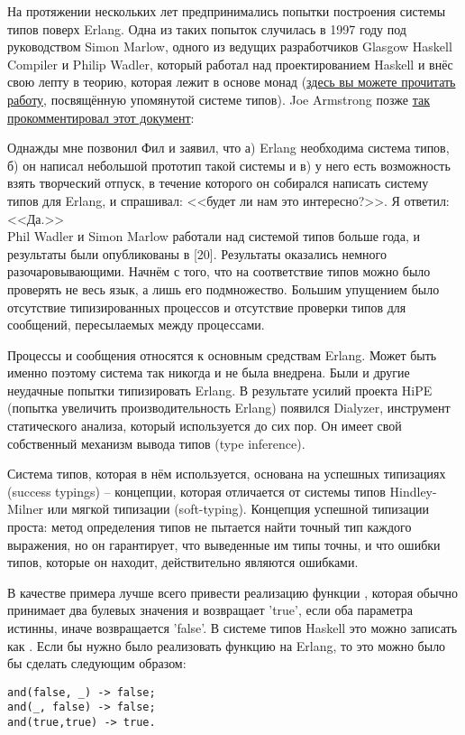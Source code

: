 На протяжении нескольких лет предпринимались попытки построения системы типов поверх Erlang.
Одна из таких попыток случилась в 1997 году под руководством Simon Marlow, одного из ведущих разработчиков Glasgow Haskell Compiler и Philip Wadler, который работал над проектированием Haskell и внёс свою лепту в теорию, которая лежит в основе монад (\href{http://www.haskell.org/~simonmar/papers/erltc.pdf}{здесь вы можете прочитать работу}, посвящённую упомянутой системе типов).
Joe Armstrong позже \href{http://www.cs.chalmers.se/Cs/Grundutb/Kurser/ppxt/HT2007/general/languages/armstrong-erlang\_history.pdf}{так прокомментировал этот документ}:\\
\colorbox{lgray}
{
    \begin{minipage}{\linewidth}
Однажды мне позвонил Фил и заявил, что а) Erlang необходима система типов, б) он написал небольшой прототип такой системы и в) у него есть возможность взять творческий отпуск, в течение которого он собирался написать систему типов для Erlang, и спрашивал: <<будет ли нам это интересно?>>.
Я ответил: <<Да.>>\\
Phil Wadler и Simon Marlow работали над системой типов больше года, и результаты были опубликованы в [20].
Результаты оказались немного разочаровывающими.
Начнём с того, что на соответствие типов можно было проверять не весь язык, а лишь его подмножество.
Большим упущением было отсутствие типизированных процессов и отсутствие проверки типов для сообщений, пересылаемых между процессами.
    \end{minipage}
}

Процессы и сообщения относятся к основным средствам Erlang.
Может быть именно поэтому система так никогда и не была внедрена.
Были и другие неудачные попытки типизировать Erlang.
В результате усилий проекта HiPE (попытка увеличить производительность Erlang) появился Dialyzer, инструмент статического анализа, который используется до сих пор.
Он имеет свой собственный механизм вывода типов (type inference).

Система типов, которая в нём используется, основана на успешных типизациях (success typings) \--- концепции, которая отличается от системы типов Hindley\--Milner или мягкой типизации (soft\--typing).
Концепция успешной типизации проста: метод определения типов не пытается найти точный тип каждого выражения, но он гарантирует, что выведенные им типы точны, и что ошибки типов, которые он находит, действительно являются ошибками.

В качестве примера лучше всего привести реализацию функции , которая обычно принимает два булевых значения и возвращает 'true', если оба параметра истинны, иначе возвращается 'false'.
В системе типов Haskell это можно записать как .
Если бы нужно было реализовать функцию  на Erlang, то это можно было бы сделать следующим образом:
\begin{lstlisting}[style=erlang]
and(false, _) -> false;
and(_, false) -> false;
and(true,true) -> true.
\end{lstlisting}

